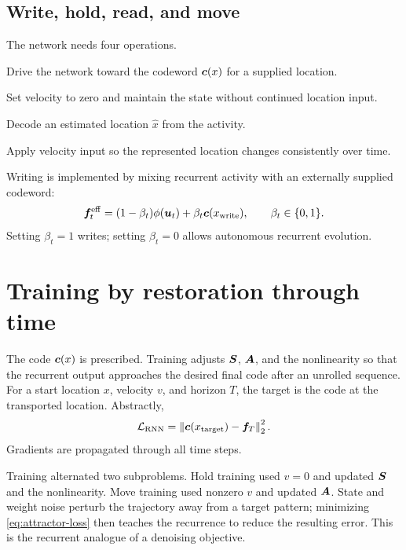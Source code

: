 \subsection{Write, hold, read, and move}
\label{sec:attractor-operations}

The network needs four operations.

\begin{description}[style=nextline]
  \item[Write] Drive the network toward the codeword $\bm{c}(x)$ for a supplied location.
  \item[Hold] Set velocity to zero and maintain the state without continued location input.
  \item[Read] Decode an estimated location $\hat{x}$ from the activity.
  \item[Move] Apply velocity input so the represented location changes consistently over time.
\end{description}

Writing is implemented by mixing recurrent activity with an externally supplied codeword:
\begin{equation}
\label{eq:attractor-write}
\bm{f}^{\mathrm{eff}}_t
=(1-\beta_t)\phi(\bm{u}_t)
+\beta_t\bm{c}(x_{\mathrm{write}}),
\qquad \beta_t\in\{0,1\}.
\end{equation}
Setting $\beta_t=1$ writes; setting $\beta_t=0$ allows autonomous recurrent evolution.

\section{Training by restoration through time}
\label{sec:attractor-training}

The code $\bm{c}(x)$ is prescribed. Training adjusts $\bm{S}$, $\bm{A}$, and the nonlinearity so that the recurrent output approaches the desired final code after an unrolled sequence. For a start location $x$, velocity $v$, and horizon $T$, the target is the code at the transported location. Abstractly,
\begin{equation}
\label{eq:attractor-loss}
\mathcal{L}_{\mathrm{RNN}}
=\left\lVert \bm{c}(x_{\mathrm{target}})-\bm{f}_T\right\rVert_2^2.
\end{equation}
Gradients are propagated through all time steps.

Training alternated two subproblems. Hold training used $v=0$ and updated $\bm{S}$ and the nonlinearity. Move training used nonzero $v$ and updated $\bm{A}$. State and weight noise perturb the trajectory away from a target pattern; minimizing \cref{eq:attractor-loss} then teaches the recurrence to reduce the resulting error. This is the recurrent analogue of a denoising objective.

